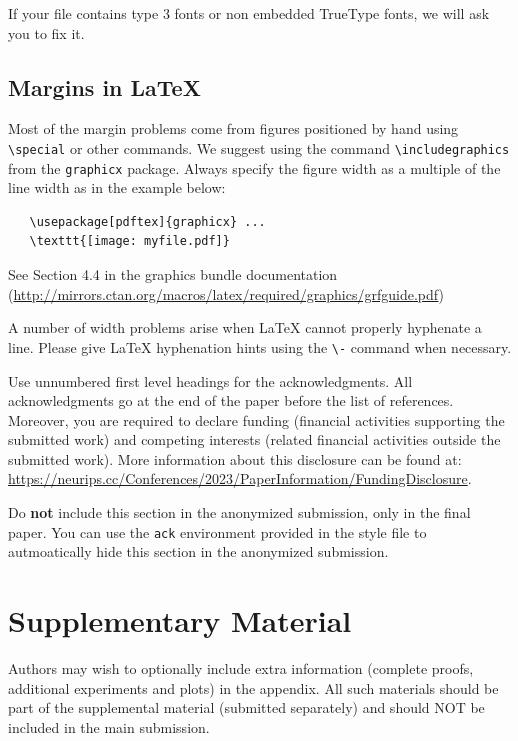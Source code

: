 \documentclass{article}
\begin{document}
If your file contains type 3 fonts or non embedded TrueType fonts, we will ask
you to fix it.


\subsection{Margins in \LaTeX{}}


Most of the margin problems come from figures positioned by hand using
\verb+\special+ or other commands. We suggest using the command
\verb+\includegraphics+ from the \verb+graphicx+ package. Always specify the
figure width as a multiple of the line width as in the example below:
\begin{verbatim}
   \usepackage[pdftex]{graphicx} ...
   \texttt{[image: myfile.pdf]}
\end{verbatim}
See Section 4.4 in the graphics bundle documentation
(\url{http://mirrors.ctan.org/macros/latex/required/graphics/grfguide.pdf})


A number of width problems arise when \LaTeX{} cannot properly hyphenate a
line. Please give LaTeX hyphenation hints using the \verb+\-+ command when
necessary.


\begin{ack}
Use unnumbered first level headings for the acknowledgments. All acknowledgments
go at the end of the paper before the list of references. Moreover, you are required to declare
funding (financial activities supporting the submitted work) and competing interests (related financial activities outside the submitted work).
More information about this disclosure can be found at: \url{https://neurips.cc/Conferences/2023/PaperInformation/FundingDisclosure}.


Do {\bf not} include this section in the anonymized submission, only in the final paper. You can use the \texttt{ack} environment provided in the style file to autmoatically hide this section in the anonymized submission.
\end{ack}



\section{Supplementary Material}

Authors may wish to optionally include extra information (complete proofs, additional experiments and plots) in the appendix. All such materials should be part of the supplemental material (submitted separately) and should NOT be included in the main submission.
\end{document}
